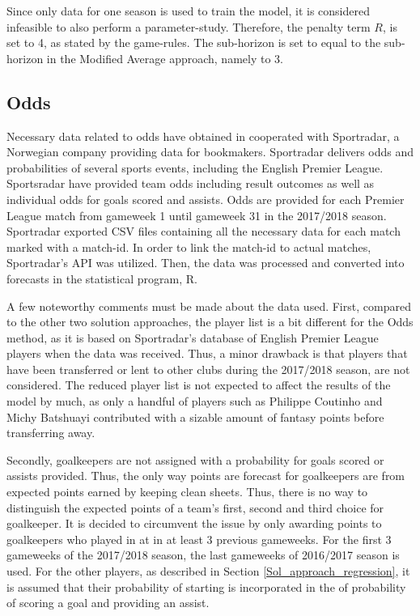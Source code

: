 \newpar

Since only data for one season is used to train the model, it is considered infeasible to also perform a parameter-study. Therefore, the penalty term $R$, is set to 4, as stated by the game-rules. The sub-horizon is set to equal to the sub-horizon in the Modified Average approach, namely to 3.

\subsection{Odds}

Necessary data related to odds have obtained in cooperated with Sportradar, a Norwegian company providing data for bookmakers. Sportradar delivers odds and probabilities of several sports events, including the English Premier League. Sportsradar have provided team odds including result outcomes as well as individual odds for goals scored and assists. Odds are provided for each Premier League match from gameweek 1 until gameweek 31 in the 2017/2018 season. Sportradar exported CSV files containing all the necessary data for each match marked with a match-id. In order to link the match-id to actual matches, Sportradar's API was utilized. Then, the data was processed and converted into forecasts in the statistical program, R.

\newpar

A few noteworthy comments must be made about the data used. First, compared to the other two solution approaches, the player list is a bit different for the Odds method, as it is based on Sportradar's database of English Premier League players when the data was received. Thus, a minor drawback is that players that have been transferred or lent to other clubs during the 2017/2018 season, are not considered. The reduced player list is not expected to affect the results of the model by much, as only a handful of players such as Philippe Coutinho and Michy Batshuayi contributed with a sizable amount of fantasy points before transferring away. 

\newpar

Secondly, goalkeepers are not assigned with a probability for goals scored or assists provided. Thus, the only way points are forecast for goalkeepers are from expected points earned by keeping clean sheets. Thus, there is no way to distinguish the expected points of a team's first, second and third choice for goalkeeper. It is decided to circumvent the issue by only awarding points to goalkeepers who played in at in at least 3 previous gameweeks. For the first 3 gameweeks of the 2017/2018 season, the last gameweeks of 2016/2017 season is used. For the other players, as described in Section \ref{Sol_approach_regression}, it is assumed that their probability of starting is incorporated in the of probability of scoring a goal and providing an assist.

